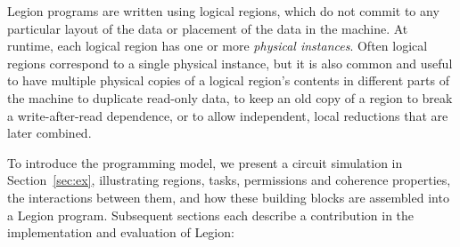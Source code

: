 \documentclass[conference]{IEEEtran}
\begin{document}
Legion programs are written using logical regions, which do not commit
to any particular layout of the data or placement of the data in the machine.  At runtime,
each logical region has one or more {\em physical instances}.  Often
logical regions correspond to a single physical instance, but it is also common and useful
to have multiple physical copies of a logical region's contents in different parts of the machine 
to duplicate read-only data, to keep an old copy of a region to break a 
write-after-read dependence, or to allow independent, local reductions that are later combined.

To introduce the programming model, we present
a circuit simulation in
Section~\ref{sec:ex}, illustrating regions, tasks,
permissions and coherence properties, the interactions between them,
and how these building blocks are assembled into a Legion
program.  Subsequent sections each describe a contribution in the
implementation and evaluation of Legion:


 
\end{document}
